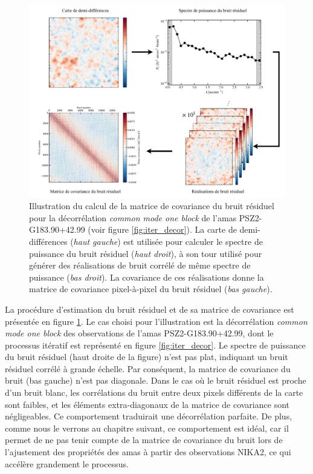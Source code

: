 \begin{figure}[t]
    \centering
    \includegraphics[width=.99\linewidth, page=1]{Figures/Chap_decor/schema_pk_tf.pdf}
    \caption{
        Illustration du calcul de la matrice de covariance du bruit résiduel pour la décorrélation \textit{common mode one block} de l'amas PSZ2-G183.90+42.99 (voir figure \ref{fig:iter_decor}).
        La carte de demi-différences (\textit{haut gauche}) est utilisée pour calculer le spectre de puissance du bruit résiduel (\textit{haut droit}), à son tour utilisé pour générer des réalisations de bruit corrélé de même spectre de puissance (\textit{bas droit}).
        La covariance de ces réalisations donne la matrice de covariance pixel-à-pixel du bruit résiduel (\textit{bas gauche}).
    }
    \label{fig:noise_pk_schema}
\end{figure}

La procédure d'estimation du bruit résiduel et de sa matrice de covariance est présentée en figure \ref{fig:noise_pk_schema}.
Le cas choisi pour l'illustration est la décorrélation \textit{common mode one block} des observations de l'amas PSZ2-G183.90+42.99, dont le processus itératif est représenté en figure \ref{fig:iter_decor}.
Le spectre de puissance du bruit résiduel (haut droite de la figure) n'est pas plat, indiquant un bruit résiduel corrélé à grande échelle.
Par conséquent, la matrice de covariance du bruit (bas gauche) n'est pas diagonale.
Dans le cas où le bruit résiduel est proche d'un bruit blanc, les corrélations du bruit entre deux pixels différents de la carte sont faibles, et les éléments extra-diagonaux de la matrice de covariance sont négligeables.
Ce comportement traduirait une décorrélation parfaite.
De plus, comme nous le verrons au chapitre suivant, ce comportement est idéal, car il permet de ne pas tenir compte de la matrice de covariance du bruit lors de l'ajustement des propriétés des amas à partir des observations NIKA2, ce qui accélère grandement le processus.

